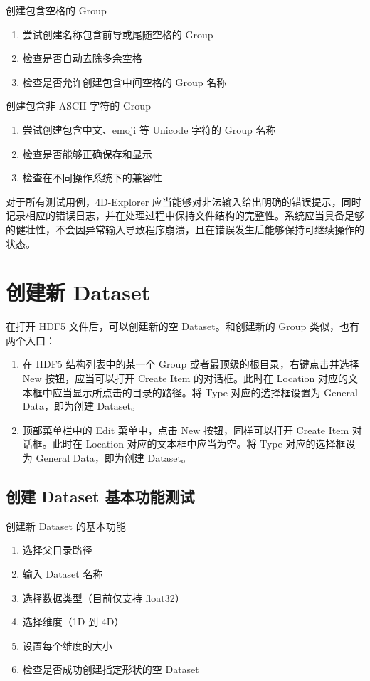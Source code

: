 \documentclass[a4paper,12pt]{report}	%
\begin{document}
创建包含空格的 Group
\begin{enumerate}
    \item 尝试创建名称包含前导或尾随空格的 Group
    \item 检查是否自动去除多余空格
    \item 检查是否允许创建包含中间空格的 Group 名称
\end{enumerate}
    
创建包含非 ASCII 字符的 Group
\begin{enumerate}
    \item 尝试创建包含中文、emoji 等 Unicode 字符的 Group 名称
    \item 检查是否能够正确保存和显示
    \item 检查在不同操作系统下的兼容性
\end{enumerate}

对于所有测试用例，4D-Explorer 应当能够对非法输入给出明确的错误提示，同时记录相应的错误日志，并在处理过程中保持文件结构的完整性。系统应当具备足够的健壮性，不会因异常输入导致程序崩溃，且在错误发生后能够保持可继续操作的状态。



\section{创建新 Dataset}
在打开 HDF5 文件后，可以创建新的空 Dataset。和创建新的 Group 类似，也有两个入口：
\begin{enumerate}
    \item 在 HDF5 结构列表中的某一个 Group 或者最顶级的根目录，右键点击并选择 New 按钮，应当可以打开 Create Item 的对话框。此时在 Location 对应的文本框中应当显示所点击的目录的路径。将 Type 对应的选择框设置为 General Data，即为创建 Dataset。
    \item 顶部菜单栏中的 Edit 菜单中，点击 New 按钮，同样可以打开 Create Item 对话框。此时在 Location 对应的文本框中应当为空。将 Type 对应的选择框设为 General Data，即为创建 Dataset。
\end{enumerate}

\subsection{创建 Dataset 基本功能测试}
创建新 Dataset 的基本功能
\begin{enumerate}
    \item 选择父目录路径
    \item 输入 Dataset 名称
    \item 选择数据类型（目前仅支持 float32）
    \item 选择维度（1D 到 4D）
    \item 设置每个维度的大小
    \item 检查是否成功创建指定形状的空 Dataset
\end{enumerate}
\end{document}
